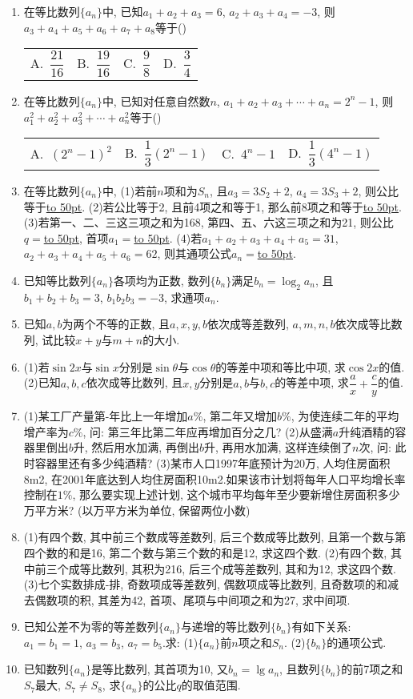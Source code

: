 \documentclass[10pt,a4paper]{article}
\newcommand{\blank}[1]{\underline{\hbox to #1pt{}}}
\newcommand{\fourch}[4]{\par\begin{tabular}{p{.23\textwidth}p{.23\textwidth}p{.23\textwidth}p{.23\textwidth}}
A.~#1 &B.~#2& C.~#3& D.~#4
\end{tabular}}
\begin{document}
\begin{enumerate}[1.]
\fourch{-4}{-1}{0}{1}
\item 在等比数列$\{a_n\}$中, 已知$a_1+a_2+a_3=6$, $a_2+a_3+a_4=-3$, 则$a_3+a_4+a_5+a_6+a_7+a_8$等于()
\fourch{$\dfrac{21}{16}$}{$\dfrac{19}{16}$}{$\dfrac 98$}{$\dfrac 34$}
\item 在等比数列$\{a_n\}$中, 已知对任意自然数$n$, $a_1+a_2+a_3+\cdots +a_n=2^n-1$, 则$a_1^2+a_2^2+a_3^2+\cdots +a_n^2$等于()
\fourch{$(2^n-1)^2$}{$\dfrac 13(2^n-1)$}{$4^n-1$}{$\dfrac 13(4^n-1)$}
\item 在等比数列$\{a_n\}$中,
(1)若前$n$项和为$S_n$, 且$a_3=3S_2+2$, $a_4=3S_3+2$, 则公比等于\blank{50}.
(2)若公比等于2, 且前4项之和等于1, 那么前8项之和等于\blank{50}.
(3)若第一、二、三这三项之和为168, 第四、五、六这三项之和为21, 则公比$q=$\blank{50}, 首项$a_1=$\blank{50}.
(4)若$a_1+a_2+a_3+a_4+a_5=31$, $a_2+a_3+a_4+a_5+a_6=62$, 则其通项公式$a_n=$\blank{50}.
\item 已知等比数列$\{a_n\}$各项均为正数, 数列$\{b_n\}$满足$b_n=\log _2a_n$, 且$b_1+b_2+b_3=3$, $b_1b_2b_3=-3$, 求通项$a_n$.
\item 已知$a,b$为两个不等的正数, 且$a,x,y,b$依次成等差数列, $a,m,n,b$依次成等比数列, 试比较$x+y$与$m+n$的大小.
\item (1)若$\sin 2x$与$\sin x$分别是$\sin \theta$与$\cos \theta$的等差中项和等比中项, 求$\cos 2x$的值.
(2)已知$a,b,c$依次成等比数列, 且$x,y$分别是$a,b$与$b,c$的等差中项, 求$\dfrac ax+\dfrac cy$的值.
\item (1)某工厂产量第-年比上一年增加$a\%$, 第二年又增加$b\%$, 为使连续二年的平均增产率为$c\%$, 问: 第三年比第二年应再增加百分之几?
(2)从盛满$a$升纯酒精的容器里倒出$b$升, 然后用水加满, 再倒出$b$升, 再用水加满, 这样连续倒了$n$次, 问: 此时容器里还有多少纯酒精?
(3)某市人口1997年底预计为20万, 人均住房面积8m2, 在2001年底达到人均住房面积10m2.如果该市计划将每年人口平均增长率控制在$1\%$, 那么要实现上述计划, 这个城市平均每年至少要新增住房面积多少万平方米? (以万平方米为单位, 保留两位小数)
\item (1)有四个数, 其中前三个数成等差数列, 后三个数成等比数列, 且第一个数与第四个数的和是16, 第二个数与第三个数的和是12, 求这四个数.
(2)有四个数, 其中前三个成等比数列, 其积为216, 后三个成等差数列, 其和为12, 求这四个数.
(3)七个实数排成-排, 奇数项成等差数列, 偶数项成等比数列, 且奇数项的和减去偶数项的积, 其差为42, 首项、尾项与中间项之和为27, 求中间项.
\item 已知公差不为零的等差数列$\{a_n\}$与递增的等比数列$\{b_n\}$有如下关系: $a_1=b_1=1$, $a_3=b_3$, $a_7=b_5$.求:
(1)$\{a_n\}$前$n$项之和$S_n$.
(2)$\{b_n\}$的通项公式.
\item 已知数列$\{a_n\}$是等比数列, 其首项为10, 又$b_n=\lg a_n$, 且数列$\{b_n\}$的前7项之和$S_7$最大, $S_7\ne S_8$, 求$\{a_n\}$的公比$q$的取值范围.

\end{enumerate}
\end{document}
